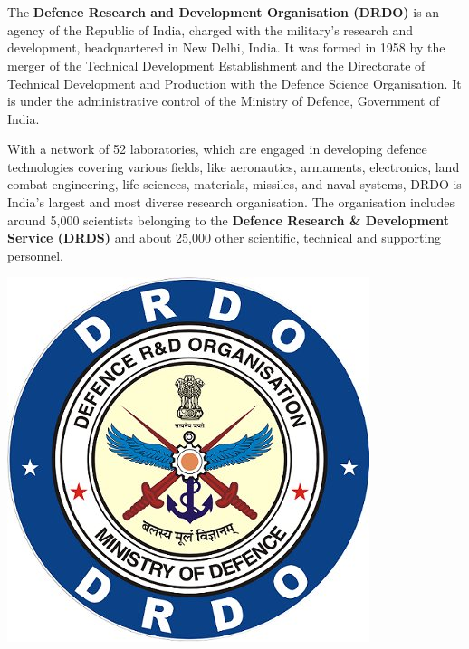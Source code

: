 \documentclass[12pt]{article} %
\date{}
\date{\vspace{-30pt}}
\begin{document}

\thispagestyle{plain}
\section*{\LARGE\bfseries{\\ }}
   The \textbf{Defence Research and Development Organisation (DRDO)} is an agency of the Republic of India, charged with the military's research and development, headquartered in New Delhi, India. It was formed in 1958 by the merger of the Technical Development Establishment and the Directorate of Technical Development and Production with the Defence Science Organisation. It is under the administrative control of the Ministry of Defence, Government of India.\\
   \par           With a network of 52 laboratories, which are engaged in developing defence technologies covering various fields, like aeronautics, armaments, electronics, land combat engineering, life sciences, materials, missiles, and naval systems, DRDO is India's largest and most diverse research organisation. The organisation includes around 5,000 scientists belonging to the \textbf{Defence Research \& Development Service (DRDS)} and about 25,000 other scientific, technical and supporting personnel.\vspace{1em}

\centerline{\includegraphics[width=0.3\linewidth]{drdo.jpg}}
\vspace{0.5em}
\end{document}
